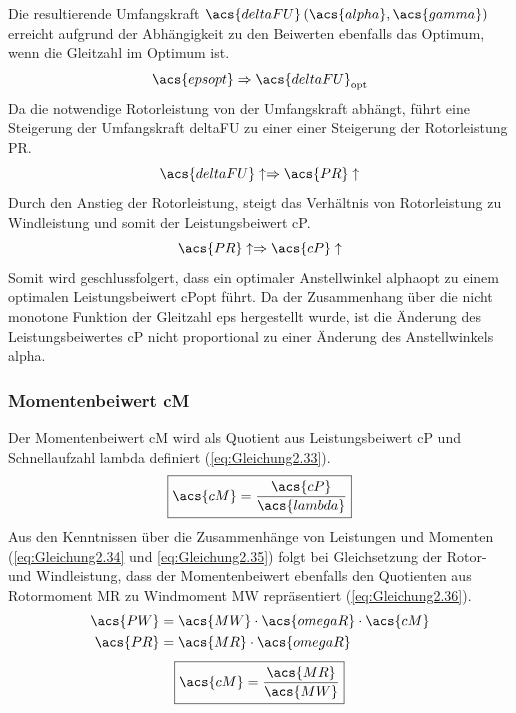 Die resultierende Umfangskraft $\acs{deltaFU}\left(\acs{alpha}, \acs{gamma}\right)$ erreicht aufgrund der Abhängigkeit zu den Beiwerten ebenfalls das Optimum, wenn die Gleitzahl im Optimum ist.
\begin{equation*}
    \acs{epsopt} \Rightarrow \acs{deltaFU}_{\mathrm{opt}}
\end{equation*}
\newline
Da die notwendige Rotorleistung von der Umfangskraft abhängt, führt eine Steigerung der Umfangskraft \acs{deltaFU} zu einer einer Steigerung der Rotorleistung \acs{PR}.
\begin{equation*}
    \acs{deltaFU}\uparrow \Rightarrow \acs{PR}\uparrow
\end{equation*}
\newline
Durch den Anstieg der Rotorleistung, steigt das Verhältnis von Rotorleistung zu Windleistung und somit der Leistungsbeiwert \acs{cP}.
\begin{equation*}
    \acs{PR}\uparrow \Rightarrow \acs{cP}\uparrow
\end{equation*}
\newline
Somit wird geschlussfolgert, dass ein optimaler Anstellwinkel \acs{alphaopt} zu einem optimalen Leistungsbeiwert \acs{cPopt} führt. Da der Zusammenhang über die nicht monotone Funktion der Gleitzahl \acs{eps} hergestellt wurde, ist die Änderung des Leistungsbeiwertes \acs{cP} nicht proportional zu einer Änderung des Anstellwinkels \acs{alpha}.

\subsubsection{Momentenbeiwert \acs{cM}}
Der Momentenbeiwert \acs{cM} wird als Quotient aus Leistungsbeiwert \acs{cP} und Schnellaufzahl \acs{lambda} definiert (\autoref{eq:Gleichung2.33}).
\begin{equation}\label{eq:Gleichung2.33}
    \boxed{\acs{cM} = \frac{\acs{cP}}{\acs{lambda}}}
\end{equation}
\newline
Aus den Kenntnissen über die Zusammenhänge von Leistungen und Momenten (\autoref{eq:Gleichung2.34} und \autoref{eq:Gleichung2.35}) folgt bei Gleichsetzung der Rotor- und Windleistung, dass der Momentenbeiwert ebenfalls den Quotienten aus Rotormoment \acs{MR} zu Windmoment \acs{MW} repräsentiert (\autoref{eq:Gleichung2.36}).
\begin{align}
    \acs{PW} &= \acs{MW} \cdot \acs{omegaR} \cdot \acs{cM} \label{eq:Gleichung2.34} \\
    \acs{PR} &= \acs{MR} \cdot \acs{omegaR} \label{eq:Gleichung2.35}
\end{align}
\begin{equation}\label{eq:Gleichung2.36}
    \boxed{\acs{cM} = \frac{\acs{MR}}{\acs{MW}}}
\end{equation}

